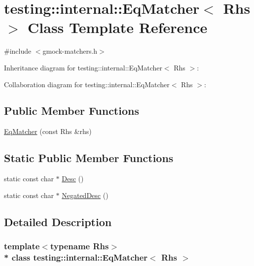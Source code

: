 \hypertarget{classtesting_1_1internal_1_1_eq_matcher}{}\section{testing\+:\+:internal\+:\+:Eq\+Matcher$<$ Rhs $>$ Class Template Reference}
\label{classtesting_1_1internal_1_1_eq_matcher}


{\ttfamily \#include $<$gmock-\/matchers.\+h$>$}



Inheritance diagram for testing\+:\+:internal\+:\+:Eq\+Matcher$<$ Rhs $>$\+:


Collaboration diagram for testing\+:\+:internal\+:\+:Eq\+Matcher$<$ Rhs $>$\+:
\subsection*{Public Member Functions}
\begin{DoxyCompactItemize}
\item 
\hyperlink{classtesting_1_1internal_1_1_eq_matcher_a9051e33bc31f413a3c958d04cc090b46}{Eq\+Matcher} (const Rhs \&rhs)
\end{DoxyCompactItemize}
\subsection*{Static Public Member Functions}
\begin{DoxyCompactItemize}
\item 
static const char $\ast$ \hyperlink{classtesting_1_1internal_1_1_eq_matcher_a3ddc72ceade061ad56debfa0a4dc2749}{Desc} ()
\item 
static const char $\ast$ \hyperlink{classtesting_1_1internal_1_1_eq_matcher_ae99a542c124694d5b91793a2df9202dc}{Negated\+Desc} ()
\end{DoxyCompactItemize}


\subsection{Detailed Description}
\subsubsection*{template$<$typename Rhs$>$\\*
class testing\+::internal\+::\+Eq\+Matcher$<$ Rhs $>$}



